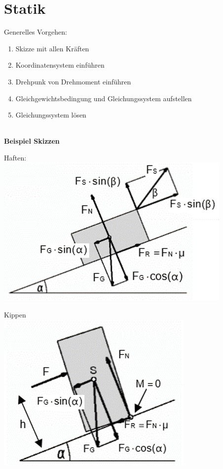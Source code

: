 \section{Statik}
Generelles Vorgehen:
\begin{enumerate}[nosep]
	\item Skizze mit allen Kräften
	\item Koordinatensystem einführen
	\item Drehpunk von Drehmoment einführen
	\item Gleichgewichtsbedingung und Gleichungssystem aufstellen
	\item Gleichungssystem lösen
\end{enumerate}

~\\
\textbf{Beispiel Skizzen}

\begin{minipage}{\textwidth}	
	\begin{minipage}{0.25\textwidth}
		Haften:\\
		\includegraphics[width=\columnwidth]{./Images/Haften.png}
	\end{minipage}%
	\begin{minipage}{0.25\textwidth}
		Kippen\\
		\includegraphics[width=\columnwidth]{./Images/Kippen.png}
	\end{minipage}
\end{minipage}



